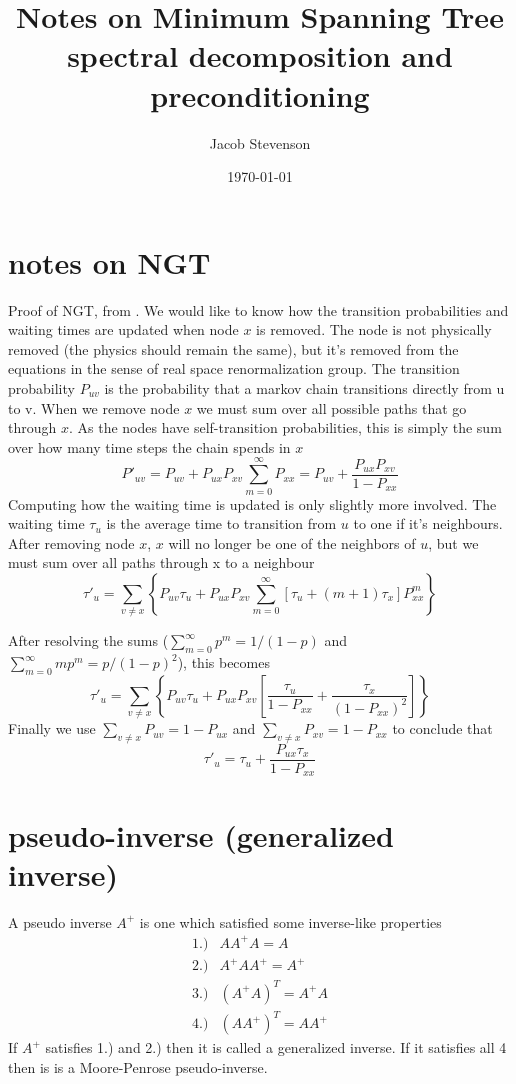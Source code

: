 \documentclass[a4paper]{article}
\title{Notes on Minimum Spanning Tree spectral decomposition and preconditioning}
\author{Jacob Stevenson}
\date{\today}
\begin{document}
\maketitle

\section{notes on NGT}
Proof of NGT, from \cite{wales.2009}.  We would like to know how the transition probabilities and waiting times
are updated when node $x$ is removed.  The node is not physically removed (the physics should remain the same), but it's
removed from the equations in the sense of real space renormalization group.  
The transition probability $P_{uv}$ is the probability that a markov chain 
transitions directly from u to v.  When we remove node $x$ we must sum over all possible paths that go through $x$.
As the nodes have self-transition probabilities, this is simply the sum over how many time steps the chain spends in $x$
\begin{equation}
P'_{uv} = P_{uv} + P_{ux} P_{xv} \sum_{m=0}^{\infty} P_{xx} = P_{uv} + \frac{ P_{ux} P_{xv} }{ 1 - P_{xx} }
\end{equation}
Computing how the waiting time is updated is only slightly more involved.  The waiting time $\tau_u$ is the average time to transition
from $u$ to one if it's neighbours.  After removing node $x$, $x$ will no longer be one of the neighbors of $u$, but we must sum
over all paths through x to a neighbour
\begin{equation}
\tau'_u = \sum_{v \ne x} \left\{ 
P_{uv} \tau_u + P_{ux} P_{xv}
\sum_{m=0}^{\infty} \left[ \tau_u + (m+1) \tau_x \right] P_{xx}^{m}
\right\}
\end{equation}

After resolving the sums ($\sum_{m=0}^{\infty} p^m = 1/(1-p)$ and $\sum_{m=0}^{\infty} m p^m = p/(1-p)^2$), this becomes
\begin{equation}
\tau'_u = \sum_{v \ne x} \left\{ 
P_{uv} \tau_u + P_{ux} P_{xv} \left[ 
\frac{\tau_u}{1-P_{xx}} + \frac{\tau_x}{(1-P_{xx})^2}
\right]
\right\}
\end{equation}
Finally we use $\sum_{v\ne x} P_{uv} = 1-P_{ux}$ and $\sum_{v\ne x} P_{xv} = 1-P_{xx}$ to conclude that
\begin{equation}
\tau'_u = \tau_u + \frac{ P_{ux} \tau_x}{1-P_{xx}}
\end{equation}

\section{pseudo-inverse (generalized inverse)}
A pseudo inverse $A^{+}$ is one which satisfied some inverse-like properties
\begin{eqnarray}
1.)&  A A^{+} A = A \\
2.)&  A^{+} A A^{+} = A^{+} \\
3.)&  (A^{+} A)^T = A^{+} A \\
4.)&  (A A^{+})^T = A A^{+}
\end{eqnarray}
If $A^{+}$ satisfies 1.) and 2.) then it is called a generalized inverse. 
If it satisfies all 4 then is is a Moore-Penrose pseudo-inverse.
\end{document}
